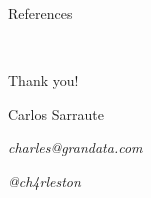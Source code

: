 \documentclass[usenames,dvipsnames]{beamer}
\begin{document}
\begin{frame}{References}
\justifying%

{}

\end{frame}

\begin{frame}{~}
\centering
\begin{huge}
Thank you!
\end{huge}

\bigskip
\bigskip
\begin{Large}

Carlos Sarraute

\medskip
\emph{charles@grandata.com}

\medskip
\emph{@ch4rleston}
\end{Large}

\end{frame}
\end{document}
